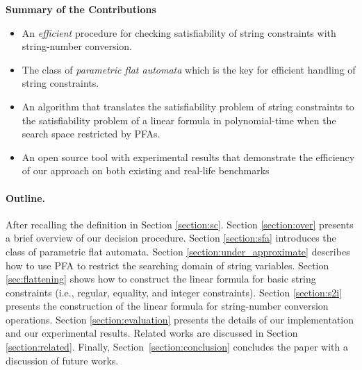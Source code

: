 \documentclass[sigplan,review,anonymous]{acmart}\settopmatter{printfolios=true,printccs=false,printacmref=false}
\begin{document}
\smallskip

\noindent
{\bf Summary of the Contributions}

\begin{itemize}

\item An {\em efficient} procedure for checking satisfiability
of string constraints with string-number conversion.



\item The class of \emph{parametric flat automata} which is the key for efficient handling of string constraints.

\item An algorithm that translates the satisfiability problem of string constraints to the satisfiability problem of a linear formula  in polynomial-time when  the search space restricted by PFAs.


\item An open source tool {\tool} with experimental
results that demonstrate the efficiency of
our approach on both existing and real-life benchmarks
\end{itemize}


\paragraph{Outline.}
After recalling the  definition in Section \ref{section:sc}. Section \ref{section:over} presents a brief overview of our decision procedure. 
Section \ref{section:sfa} introduces  the class of parametric flat automata. 
Section \ref{section:under_approximate} describes how to use PFA to restrict the searching domain of string variables.
Section \ref{sec:flattening} shows how to construct the linear formula for  basic string constraints (i.e., 
regular, equality, and integer constraints). 
 Section \ref{section:s2i} presents the construction of the linear formula for string-number conversion operations. Section \ref{section:evaluation} presents the details of our implementation and our experimental results.
 Related works are discussed in Section \ref{section:related}. Finally, Section~\ref{section:conclusion} concludes the paper with a discussion of future works.
\end{document}
